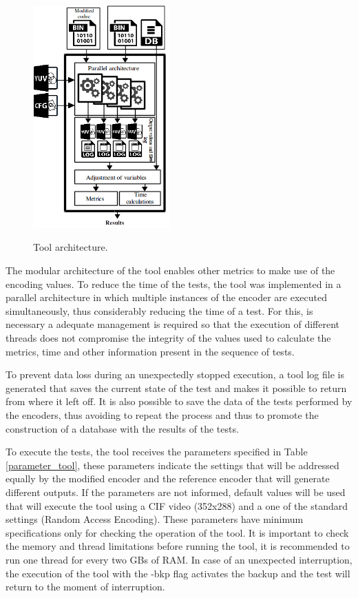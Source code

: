 \documentclass[journal]{IEEEtran}
\begin{document}


\FloatBarrier
\begin{figure}[!ht]
	\centering
	\caption{Tool architecture.}
	\includegraphics[width=0.47\textwidth]{figures/fluxo.png}
	\label{fig:fluxo}	
\end{figure}
\FloatBarrier

The modular architecture of the tool enables other metrics to make use of the encoding values. To reduce the time of the tests, the tool was implemented in a parallel architecture in which multiple instances of the encoder are executed simultaneously, thus considerably reducing the time of a test. For this, is necessary a adequate management is required so that the execution of different threads does not compromise the integrity of the values used to calculate the metrics, time and other information present in the sequence of tests.

To prevent data loss during an unexpectedly stopped execution, a tool log file is generated that saves the current state of the test and makes it possible to return from where it left off. It is also possible to save the data of the tests performed by the encoders, thus avoiding to repeat the process and thus to promote the construction of a database with the results of the tests.

To execute the tests, the tool receives the parameters specified in Table \ref{parameter_tool}, these parameters indicate the settings that will be addressed equally by the modified encoder and the reference encoder that will generate different outputs. If the parameters are not informed, default values will be used that will execute the tool using a CIF video (352x288) and a one of the standard settings (Random Access Encoding). These parameters have minimum specifications only for checking the operation of the tool. It is important to check the memory and thread limitations before running the tool, it is recommended to run one thread for every two GBs of RAM. In case of an unexpected interruption, the execution of the tool with the -bkp flag activates the backup and the test will return to the moment of interruption.
\end{document}
